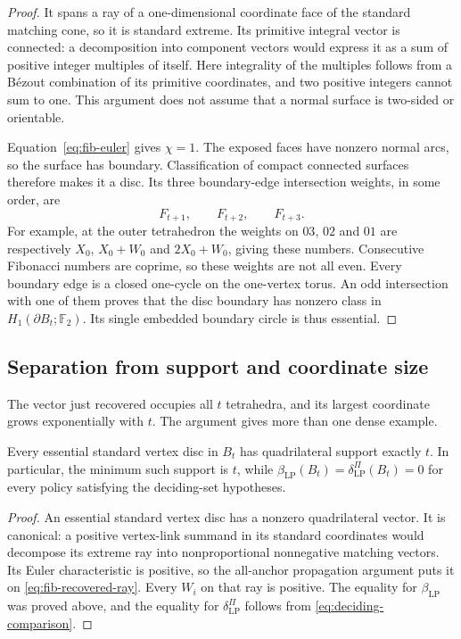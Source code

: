 \begin{proof}
It spans a ray of a one-dimensional coordinate face of the standard
matching cone, so it is standard extreme.  Its primitive integral vector
is connected: a decomposition into component vectors would express it as
a sum of positive integer multiples of itself.  Here integrality of the
multiples follows from a B\'ezout combination of its primitive coordinates,
and two positive integers cannot sum to one.  This argument does not assume
that a normal surface is two-sided or orientable.

Equation~\eqref{eq:fib-euler} gives $\chi=1$.  The exposed faces have
nonzero normal arcs, so the surface has boundary.  Classification of compact
connected surfaces therefore makes it a disc.  Its three boundary-edge
intersection weights, in some order, are
\[
 F_{t+1},\qquad F_{t+2},\qquad F_{t+3}.
\]
For example, at the outer tetrahedron the weights on $03$, $02$ and $01$
are respectively $X_0$, $X_0+W_0$ and $2X_0+W_0$, giving these numbers.
Consecutive Fibonacci numbers are coprime, so these weights are not all
even.  Every boundary edge is a closed one-cycle on the one-vertex torus.
An odd intersection with one of them proves that the disc boundary has
nonzero class in $H_1(\partial B_t;\mathbb F_2)$.  Its single embedded
boundary circle is thus essential.
\end{proof}

\subsection{Separation from support and coordinate size}

The vector just recovered occupies all $t$ tetrahedra, and its largest
coordinate grows exponentially with $t$.  The argument gives more than
one dense example.

\begin{corollary}\label{cor:fib-exact-support}
Every essential standard vertex disc in $B_t$ has quadrilateral support
exactly $t$.  In particular, the minimum such support is $t$, while
$\beta_{\mathrm{LP}}(B_t)=\delta_{\mathrm{LP}}^{\Pi}(B_t)=0$ for every
policy satisfying the deciding-set hypotheses.
\end{corollary}
\begin{proof}
An essential standard vertex disc has a nonzero quadrilateral vector.
It is canonical: a positive vertex-link summand in its standard
coordinates would decompose its extreme ray into nonproportional
nonnegative matching vectors.  Its Euler characteristic is positive,
so the all-anchor propagation argument puts it on
\eqref{eq:fib-recovered-ray}.  Every $W_i$ on that ray is positive.
The equality for $\beta_{\mathrm{LP}}$ was proved above, and the equality
for $\delta_{\mathrm{LP}}^{\Pi}$ follows from
\eqref{eq:deciding-comparison}.
\end{proof}


